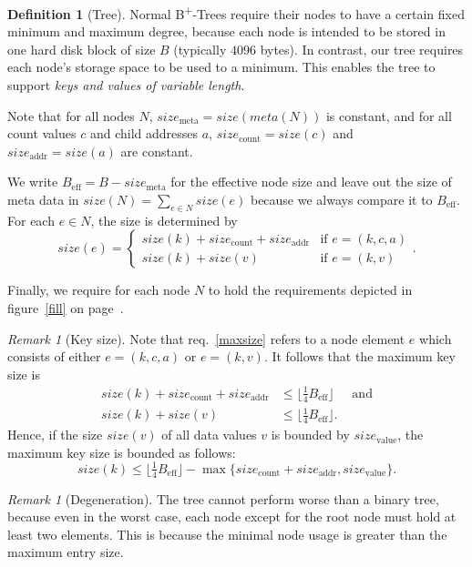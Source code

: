 \documentclass[a4paper, 8pt]{scrartcl}
\theoremstyle{plain}
\theoremstyle{definition}
\newtheorem{defi}[thm]{Definition}
\theoremstyle{remark}
\newtheorem{rem}[thm]{Remark}
\newcommand \BTrees { B\textsuperscript{+}-Trees }
\newcommand \Beff { B_{\text{eff}} }
\begin{document}
\begin{multicols}{2}
\begin{defi}[Tree]
Normal \BTrees require their nodes to have a certain fixed minimum and maximum
degree, because each node is intended to be stored in one hard disk block of
size $B$ (typically $4096$ bytes).
In contrast, our tree requires each node's storage space to be used to a
minimum.
This enables the tree to support {\em keys and values of variable length}.

Note that for all nodes $N$, $size_\text{meta} = size(meta(N))$ is constant,
and for all count values $c$ and child addresses $a$, $size_\text{count} =
size(c)$ and $size_\text{addr} = size(a)$ are constant.

We write $\Beff = B - size_\text{meta}$ for the effective node size and leave
out the size of meta data in $size(N) = \sum_{e \in N} size(e)$ because we
always compare it to $\Beff$.
For each $e \in N$, the size is determined by
\[ size(e) = \begin{cases}
size(k) + size_\text{count} + size_\text{addr} & \text{if } e = (k,c,a)\\
size(k) + size(v)                              & \text{if } e = (k,v)
\end{cases}. \]

Finally, we require for each node $N$ to hold the requirements depicted in
figure~\ref{fill} on page~\pageref{fill}.
\end{defi}


\begin{rem}[Key size]
Note that req.~\ref{maxsize} refers to a node element $e$ which consists
of either \mbox{$e = (k, c, a)$} or \mbox{$e = (k, v)$}.
It follows that the maximum key size is
\begin{align*}
size(k) + size_\text{count} + size_\text{addr}
    &\leq \lfloor \tfrac{1}{4} \Beff \rfloor & \text{ and}\\
size(k) + size(v)
    &\leq \lfloor \tfrac{1}{4} \Beff \rfloor.
\end{align*}
Hence, if the size $size(v)$ of all data values $v$ is bounded by
$size_\text{value}$, the maximum key size is bounded as follows:
\[ size(k) \leq \lfloor \tfrac{1}{4} \Beff \rfloor 
    - \max \{ size_\text{count} + size_\text{addr}, size_\text{value} \}. \]
\end{rem}


\begin{rem}[Degeneration]
The tree cannot perform worse than a binary tree, because even in the worst
case, each node except for the root node must hold at least two elements.
This is because the minimal node usage is greater than the maximum entry size.
\end{rem}




\end{multicols}
\end{document}
